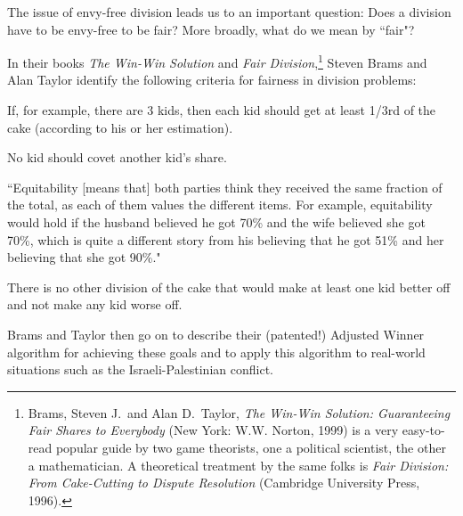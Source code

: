 The issue of envy-free division leads us to an important question: Does a division have to be envy-free to be fair? More broadly, what do we mean by ``fair"?

In their books \emph{The Win-Win Solution} and \emph{Fair Division},\footnote{Brams, Steven J.\ and Alan D.\ Taylor, \emph{The Win-Win Solution: Guaranteeing Fair Shares to Everybody} (New York: W.W. Norton, 1999) is a very easy-to-read popular guide by two game theorists, one a political scientist, the other a mathematician. A theoretical treatment by the same folks is \emph{Fair Division: From Cake-Cutting to Dispute Resolution} (Cambridge University Press, 1996).} Steven Brams and Alan Taylor identify the following criteria for fairness in division problems:

\begin{description}

\item [Proportionality] If, for example, there are 3 kids, then each kid should get at least 1/3rd of the cake (according to his or her estimation).

\item [Envy-free] No kid should covet another kid's share.

\item [Equitability] ``Equitability [means that] both parties think they received the same fraction of the total, as each of them values the different items. For example, equitability would hold if the husband believed he got 70\% and the wife believed she got 70\%, which is quite a different story from his believing that he got 51\% and her believing that she got 90\%."

\item [Pareto efficiency] There is no other division of the cake that would make at least one kid better off and not make any kid worse off.

\end{description}

Brams and Taylor then go on to describe their (patented!) Adjusted Winner algorithm for achieving these goals and to apply this algorithm to real-world situations such as the Israeli-Palestinian conflict.



